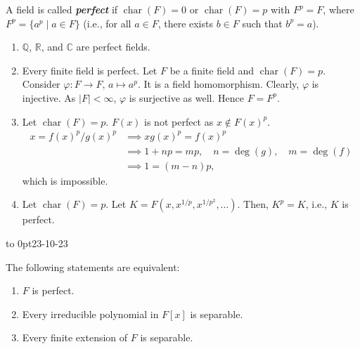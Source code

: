 \documentclass[twoside]{article}
\DeclareMathOperator\Char{char}
\newcommand\Q{\mathbb Q}
\newcommand\R{\mathbb R}
\newcommand\C{\mathbb C}
\theoremstyle{remark}
\newcommand*\term[1]{\textbf{\textit{\mathversion{bold}#1}}}
\newcommand*\newclass[1]{\par\vbox to 0pt{\hbox{\tiny\sffamily\color{gray}#1}} \par\ignorespaces}
\begin{document}
\begin{definition}
  A field is called \term{perfect} if \(\Char(F) = 0\) or \(\Char(F) = p\) with \(F^p = F\), where \(F^p = \{a^p \mid a \in F\}\) (i.e., for all \(a \in F\), there exists \(b \in F\) such that \(b^p = a\)).
\end{definition}

\begin{examples}
  \begin{enumerate}
    \item \(\Q\), \(\R\), and \(\C\) are perfect fields.
    \item Every finite field is perfect. Let \(F\) be a finite field and \(\Char(F) = p\). Consider \(\varphi\colon F \to F\), \(a \mapsto a^p\). It is a field homomorphism. Clearly, \(\varphi\) is injective. As \(|F| < \infty\), \(\varphi\) is surjective as well. Hence \(F = F^p\).
    \item Let \(\Char(F) = p\). \(F(x)\) is not perfect as \(x \notin F(x)^p\).
    \begin{align*}
      x = f(x)^p / g(x)^p & \implies xg(x)^p = f(x)^p \\
      & \implies 1 + np = mp, \quad n =\deg(g), \quad m = \deg(f) \\
      & \implies 1 = (m-n) p,
    \end{align*}
    which is impossible.
    \item Let \(\Char(F) = p\). Let \(K = F(x, x^{1/p}, x^{1/p^2}, \dots)\). Then, \(K^p = K\), i.e., \(K\) is perfect.
  \end{enumerate}
\end{examples}

\newclass{23-10-23}

\begin{proposition}
  The following statements are equivalent:
  \begin{enumerate}[label=\textup{(\arabic*)},nosep]
    \item \(F\) is perfect.
    \item Every irreducible polynomial in \(F[x]\) is separable.
    \item Every finite extension of \(F\) is separable.
  \end{enumerate}
\end{proposition}
\end{document}
